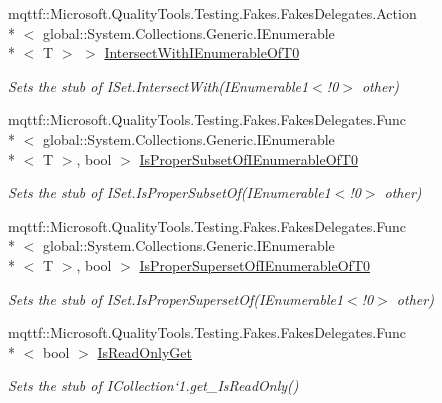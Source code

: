 \begin{DoxyCompactItemize}
mqttf\-::\-Microsoft.\-Quality\-Tools.\-Testing.\-Fakes.\-Fakes\-Delegates.\-Action\\*
$<$ global\-::\-System.\-Collections.\-Generic.\-I\-Enumerable\\*
$<$ T $>$ $>$ \hyperlink{class_system_1_1_collections_1_1_generic_1_1_fakes_1_1_stub_i_set_3_01_t_01_4_ac9bce9225513be35e85a66d7733f45f6}{Intersect\-With\-I\-Enumerable\-Of\-T0}
\begin{DoxyCompactList}\small\item\em Sets the stub of I\-Set{.\-Intersect\-With(I\-Enumerable}1$<$!0$>$ other)\end{DoxyCompactList}\item 
mqttf\-::\-Microsoft.\-Quality\-Tools.\-Testing.\-Fakes.\-Fakes\-Delegates.\-Func\\*
$<$ global\-::\-System.\-Collections.\-Generic.\-I\-Enumerable\\*
$<$ T $>$, bool $>$ \hyperlink{class_system_1_1_collections_1_1_generic_1_1_fakes_1_1_stub_i_set_3_01_t_01_4_a95a094b7fd75776f64074f138ebea1a7}{Is\-Proper\-Subset\-Of\-I\-Enumerable\-Of\-T0}
\begin{DoxyCompactList}\small\item\em Sets the stub of I\-Set{.\-Is\-Proper\-Subset\-Of(I\-Enumerable}1$<$!0$>$ other)\end{DoxyCompactList}\item 
mqttf\-::\-Microsoft.\-Quality\-Tools.\-Testing.\-Fakes.\-Fakes\-Delegates.\-Func\\*
$<$ global\-::\-System.\-Collections.\-Generic.\-I\-Enumerable\\*
$<$ T $>$, bool $>$ \hyperlink{class_system_1_1_collections_1_1_generic_1_1_fakes_1_1_stub_i_set_3_01_t_01_4_a4dab5fa4d0fc626c286f50ba4e83efd5}{Is\-Proper\-Superset\-Of\-I\-Enumerable\-Of\-T0}
\begin{DoxyCompactList}\small\item\em Sets the stub of I\-Set{.\-Is\-Proper\-Superset\-Of(I\-Enumerable}1$<$!0$>$ other)\end{DoxyCompactList}\item 
mqttf\-::\-Microsoft.\-Quality\-Tools.\-Testing.\-Fakes.\-Fakes\-Delegates.\-Func\\*
$<$ bool $>$ \hyperlink{class_system_1_1_collections_1_1_generic_1_1_fakes_1_1_stub_i_set_3_01_t_01_4_afa7bd8aed11b6fe9eaa44f1f4e8b08c0}{Is\-Read\-Only\-Get}
\begin{DoxyCompactList}\small\item\em Sets the stub of I\-Collection`1.get\-\_\-\-Is\-Read\-Only()\end{DoxyCompactList}\item 

\end{DoxyCompactItemize}
